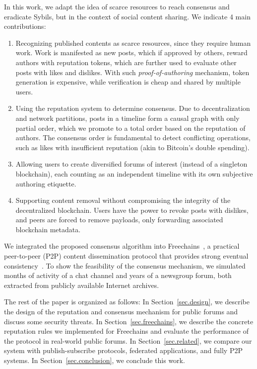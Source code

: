\documentclass[12pt]{article}
\newcommand{\FC}       {Freechains\xspace}
\begin{document}
In this work, we adapt the idea of scarce resources to reach consensus and
eradicate Sybils, but in the context of social content sharing.
We indicate 4 main contributions:
%
\begin{enumerate}
\item Recognizing published contents as scarce resources, since they require
human work.
Work is manifested as new posts, which if approved by others, reward authors
with reputation tokens, which are further used to evaluate other posts with
likes and dislikes.
With such \emph{proof-of-authoring} mechanism, token generation is expensive,
while verification is cheap and shared by multiple users.
%
\item Using the reputation system to determine consensus.
Due to decentralization and network partitions, posts in a timeline form a
causal graph with only partial order, which we promote to a total order based
on the reputation of authors.
The consensus order is fundamental to detect conflicting operations, such as
likes with insufficient reputation (akin to Bitcoin's double spending).
%
\item Allowing users to create diversified forums of interest (instead of a
singleton blockchain), each counting as an independent timeline with its own
subjective authoring etiquette.
%
\item Supporting content removal without compromising the integrity of the
decentralized blockchain.
Users have the power to revoke posts with dislikes, and peers are forced to
remove payloads, only forwarding associated blockchain metadata.
\end{enumerate}
%
We integrated the proposed consensus algorithm into \FC~\cite{fcs.sbseg20}, a
practical peer-to-peer (P2P) content dissemination protocol that provides
strong eventual consistency~\cite{p2p.sec}.
To show the feasibility of the consensus mechanism, we simulated months of
activity of a chat channel and years of a newsgroup forum, both extracted from
publicly available Internet archives.

The rest of the paper is organized as follows:
In Section~\ref{sec.design}, we describe the design of the reputation and
consensus mechanism for public forums and discuss some security threats.
In Section~\ref{sec.freechains}, we describe the concrete reputation rules we
implemented for \FC and evaluate the performance of the protocol in real-world
public forums.
In Section~\ref{sec.related}, we compare our system with publish-subscribe
protocols, federated applications, and fully P2P systems.
In Section~\ref{sec.conclusion}, we conclude this work.
\end{document}
